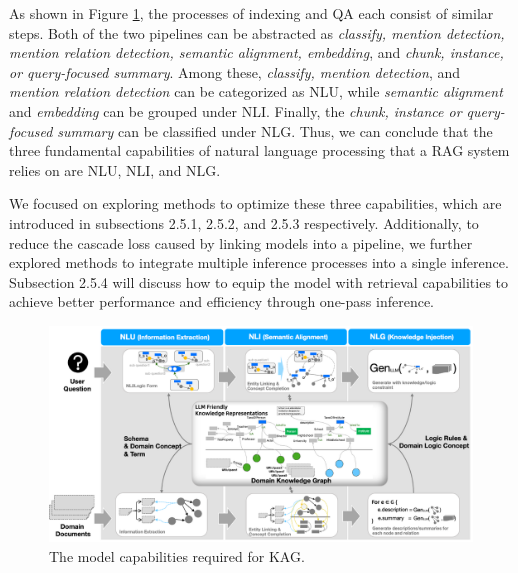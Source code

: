\documentclass{article}
\begin{document}
As shown in Figure \ref{fig:Synergy-nlp-kg}, the processes of indexing and QA each consist of similar steps. Both of the two pipelines can be abstracted as \textit{classify, mention detection, mention relation detection, semantic alignment, embedding}, and \textit{chunk, instance, or query-focused summary}. Among these, \textit{classify, mention detection}, and \textit{mention relation detection} can be categorized as NLU, while \textit{semantic alignment} and \textit{embedding} can be grouped under NLI. Finally, the \textit{chunk, instance or query-focused summary} can be classified under NLG. Thus, we can conclude that the three fundamental capabilities of natural language processing that a RAG system relies on are NLU, NLI, and NLG.

We focused on exploring methods to optimize these three capabilities, which are introduced in subsections 2.5.1, 2.5.2, and 2.5.3 respectively. Additionally, to reduce the cascade loss caused by linking models into a pipeline, we further explored methods to integrate multiple inference processes into a single inference. Subsection 2.5.4 will discuss how to equip the model with retrieval capabilities to achieve better performance and efficiency through one-pass inference.


\begin{figure}[htbp]
    \centering
    \includegraphics[width=0.9\linewidth]{figures/nlp_kg_co.png}
    \caption{The model capabilities required for KAG.}
    \label{fig:Synergy-nlp-kg}
\end{figure}
\end{document}
